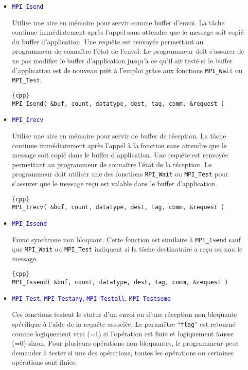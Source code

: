 \documentclass[11pt,a4paper]{article}
\begin{document}
\begin{itemize}
\item \textcolor{blue}{\texttt{MPI\_Isend}}

Utilise une aire en mémoire pour servir comme buffer d'envoi. La tâche continue
immédiatement après l'appel sans attendre que le message soit copié du
buffer d'application. Une requête est renvoyée permettant au programmeur de
connaître l'état de l'envoi. Le programmeur doit s'assurer de ne pas modifier
le buffer d'application jusqu'à ce qu'il ait testé si le buffer d'application
est de nouveau prêt à l'emploi grâce aux fonctions \texttt{MPI\_Wait} ou
\texttt{MPI\_Test}.

\begin{lstlisting}{cpp}
MPI_Isend( &buf, count, datatype, dest, tag, comm, &request )
\end{lstlisting}

\item \textcolor{blue}{\texttt{MPI\_Irecv}}

Utilise une aire en mémoire pour servir de buffer de réception. La tâche continue
immédiatement après l'appel à la fonction sans attendre que le message soit copié
dans le buffer d'application. Une requête est renvoyée permettant au programmeur
de connaître l'état de la réception. Le programmeur doit utiliser une des
fonctions \texttt{MPI\_Wait} ou \texttt{MPI\_Test} pour s'assurer que le message
reçu est valable dans le buffer d'application.

\begin{lstlisting}{cpp}
MPI_Irecv( &buf, count, datatype, dest, tag, comm, &request )
\end{lstlisting}

\item \textcolor{blue}{\texttt{MPI\_Issend}}

Envoi synchrone non bloquant. Cette fonction est similaire à \texttt{MPI\_Isend}
sauf que \texttt{MPI\_Wait} ou \texttt{MPI\_Test} indiquent si la tâche destinataire
a reçu ou non le message.

\begin{lstlisting}{cpp}
MPI_Issend( &buf, count, datatype, dest, tag, comm, &request )
\end{lstlisting}

\item \textcolor{blue}{\texttt{MPI\_Test}, \texttt{MPI\_Testany}, \texttt{MPI\_Testall}, \texttt{MPI\_Testsome}}

Ces fonctions testent le status d'un envoi ou d'une réception non bloquante spécifique à l'aide de la requête associée. 
Le paramêtre ``\texttt{flag}'' est retourné
comme logiquement vrai (=1) si l'opération est finie et logiquement fausse (=0) sinon. Pour plusieurs opérations non
bloquantes, le programmeur peut demander à tester si une des opérations, toutes les opérations ou certaines opérations
sont finies.


\end{itemize}
\end{document}
